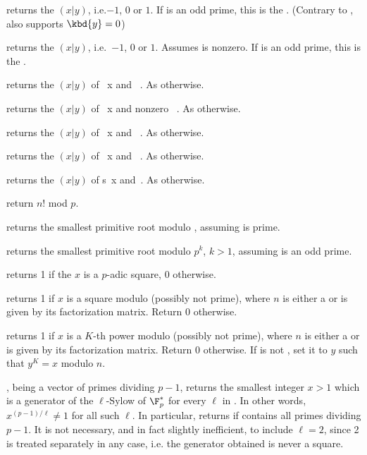  returns the  $(x|y)$,
i.e.$-1$, $0$ or $1$. If  is an odd prime, this is the . (Contrary to ,  also supports $\kbd{y} = 0$)

 returns the 
$(x|y)$, i.e.~$-1$, $0$ or $1$. Assumes  is nonzero. If  is an
odd prime, this is the .

 returns the  $(x|y)$
of ~x and ~. As  otherwise.

 returns the  $(x|y)$
of ~x and nonzero ~. As  otherwise.

 returns the  $(x|y)$
of ~x and ~. As  otherwise.

 returns the  $(x|y)$
of ~x and ~. As  otherwise.

 returns the  $(x|y)$
of s~x and~. As  otherwise.

 return $n!$ mod $p$.

 returns the smallest primitive root modulo
, assuming  is prime.

 returns the smallest primitive root modulo $p^k$,
$k > 1$, assuming  is an odd prime.

 returns 1 if the  $x$ is
a $p$-adic square, $0$ otherwise.

 returns 1 if  $x$ is
a square modulo  (possibly not prime), where $n$ is either a 
or is given by its factorization matrix. Return $0$ otherwise.

 returns 1 if 
$x$ is a $K$-th power modulo  (possibly not prime), where $n$ is
either a  or is given by its factorization matrix. Return $0$
otherwise. If  is not , set it to $y$ such that $y^K = x$
modulo $n$.

,  being a vector of
primes dividing $p - 1$, returns the smallest integer $x > 1$ which is a
generator of the $\ell$-Sylow of $\F_p^*$ for every $\ell$ in . In
other words, $x^{(p-1)/\ell} \neq 1$ for all such $\ell$. In particular,
returns  if  contains all primes dividing $p - 1$.
It is not necessary, and in fact slightly inefficient, to include $\ell=2$,
since 2 is treated separately in any case, i.e. the generator obtained is
never a square.

